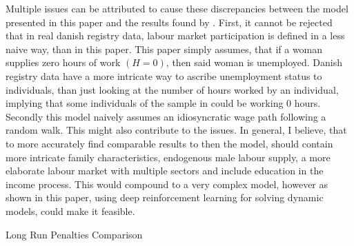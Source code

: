 Multiple issues can be attributed to cause these discrepancies between the model presented in this paper and the results found by \textcite{kleven_children_2019}. First, it cannot be rejected that in real danish registry data, labour market participation is defined in a less naive way, than in this paper. This paper simply assumes, that if a woman supplies zero hours of work $(H=0)$, then said woman is unemployed. Danish registry data have a more intricate way to ascribe unemployment status to individuals, than just looking at the number of hours worked by an individual, implying that some individuals of the sample in \textcite{kleven_children_2019} could be working 0 hours. Secondly this model naively assumes an idiosyncratic wage path following a random walk. This might also contribute to the issues. In general, I believe, that to more accurately find comparable results to \textcite{kleven_children_2019} then the model, should contain more intricate family characteristics, endogenous male labour supply, a more elaborate labour market with multiple sectors and include education in the income process. This would compound to a very complex model, however as shown in this paper, using deep reinforcement learning for solving dynamic models, could make it feasible.

\begin{table}[ht]
    \centering
    
    \caption{Long Run Penalties Comparison}
    \label{tab:extended_results}
\end{table}




